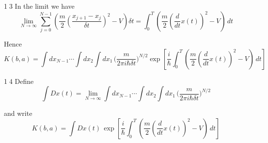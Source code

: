 \textcircled{\scriptsize13}
In the limit we have
\begin{equation*}
\lim_{N\rightarrow\infty}
\sum_{j=0}^{N-1}
\left(
\frac{m}{2}\left(\frac{x_{j+1}-x_j}{\delta t}\right)^2-V
\right)\delta t
=
\int_0^T
\left(
\frac{m}{2}\left(\frac{d}{dt}x(t)\right)^2-V
\right)\,dt
\end{equation*}

Hence
\begin{equation*}
K(b,a)=\int dx_{N-1}\cdots\int dx_2\int dx_1\,
\biggl(\frac{m}{2\pi i\hbar\delta t}\biggr)^{N/2}
\exp\left[
\frac{i}{\hbar}
\int_0^T
\left(
\frac{m}{2}\left(\frac{d}{dt}x(t)\right)^2-V
\right)
\,dt
\right]
\end{equation*}

\textcircled{\scriptsize14}
Define
\begin{equation*}
\int Dx(t)=\lim_{N\rightarrow\infty}
\int dx_{N-1}\cdots\int dx_2\int dx_1\,
\biggl(\frac{m}{2\pi i\hbar\delta t}\biggr)^{N/2}
\end{equation*}

and write
\begin{equation*}
K(b,a)=\int Dx(t)\,
\exp\left[
\frac{i}{\hbar}
\int_0^T
\left(
\frac{m}{2}\left(\frac{d}{dt}x(t)\right)^2-V
\right)
\,dt
\right]
\end{equation*}



